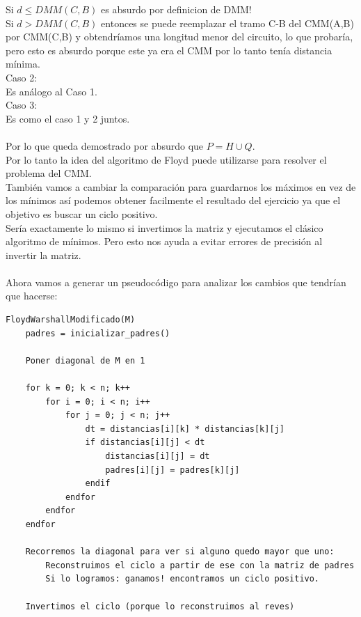 \documentclass[11pt,a4paper]{article}
\begin{document}
Si $d \leq DMM(C,B)$ es absurdo por definicion de DMM!\\
Si $d > DMM(C,B)$ entonces se puede reemplazar el tramo C-B del CMM(A,B) por CMM(C,B) y obtendríamos una longitud menor del circuito, lo que probaría, pero esto es absurdo porque este ya era el CMM por lo tanto tenía distancia mínima.\\
Caso 2:\\
Es análogo al Caso 1.\\
Caso 3:\\
Es como el caso 1 y 2 juntos.\\
\\
Por lo que queda demostrado por absurdo que $P = H \cup Q$.\\
Por lo tanto la idea del algoritmo de Floyd puede utilizarse para resolver el problema del CMM.\\
También vamos a cambiar la comparación para guardarnos los máximos en vez de los mínimos así podemos obtener facilmente el resultado del ejercicio ya que el objetivo es buscar un ciclo positivo.\\
Sería exactamente lo mismo si invertimos la matriz y ejecutamos el clásico algoritmo de mínimos. Pero esto nos ayuda a evitar errores de precisión al invertir la matriz.\\ 
\\
Ahora vamos a generar un pseudocódigo para analizar los cambios que tendrían que hacerse:

\begin{Verbatim}[commandchars=\\\{\}]
FloydWarshallModificado(M)
    padres = inicializar_padres()
    
    Poner diagonal de M en 1
    
    for k = 0; k < n; k++ 
        for i = 0; i < n; i++
            for j = 0; j < n; j++
                dt = distancias[i][k] * distancias[k][j]
                if distancias[i][j] < dt
                    distancias[i][j] = dt
                    padres[i][j] = padres[k][j]
                endif
            endfor
        endfor
    endfor
    
    Recorremos la diagonal para ver si alguno quedo mayor que uno:
        Reconstruimos el ciclo a partir de ese con la matriz de padres
        Si lo logramos: ganamos! encontramos un ciclo positivo.
        
    Invertimos el ciclo (porque lo reconstruimos al reves)
\end{Verbatim}
\end{document}
